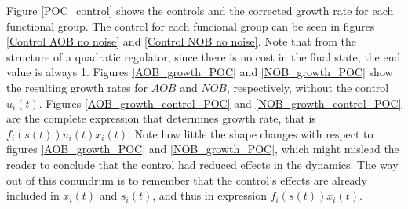 \documentclass[3p,times]{article}
\begin{document}
Figure \ref{POC_control} shows the controls and the corrected growth rate for each functional group. The control for each funcional group can be seen in figures \ref{Control AOB no noise} and \eqref{Control NOB no noise}. Note that from the structure of a quadratic regulator, since there is no cost in the final state, the end value is always 1. Figures \ref{AOB_growth_POC} and \ref{NOB_growth_POC} show the resulting growth rates for $AOB$ and $NOB$, respectively, without the control $u_i(t)$. Figures \ref{AOB_growth_control_POC} and \ref{NOB_growth_control_POC} are the complete expression that determines growth rate, that is  $f_i(s(t))u_i(t)x_i(t)$. Note how little the shape changes with respect to figures \ref{AOB_growth_POC} and \ref{NOB_growth_POC}, which might mislead the reader to conclude that the control had reduced effects in the dynamics. The way out of this conundrum is to remember that the control's effects are already included in $x_i(t)$ and $s_i(t)$, and thus in expression $f_i(s(t))x_i(t)$. 
\end{document}

